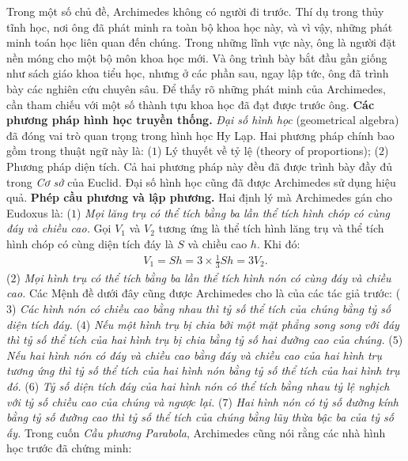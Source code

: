 \begin{multicols}{2}
	\vskip 0.1cm
	Trong một số chủ đề, Archimedes không có người đi trước. Thí dụ trong thủy tĩnh học, nơi ông đã phát minh ra toàn bộ khoa học này, và vì vậy, những phát minh toán học liên quan đến chúng. Trong những lĩnh vực này, ông là người đặt nền móng cho một bộ môn khoa học mới. Và ông trình bày bắt đầu gần giống như sách giáo khoa tiểu học, nhưng ở các phần sau, ngay lập tức, ông đã trình bày các nghiên cứu chuyên sâu. 
	\vskip 0.1cm
	Để thấy rõ những phát minh của Archimedes, cần tham chiếu với một số thành tựu khoa học đã đạt được trước ông.
	\vskip 0.1cm
	\textbf{\color{lichsutoanhoc}Các phương pháp hình học truyền thống.} \textit{Đại số hình học} (geometrical algebra) đã đóng vai trò quan trọng trong hình học Hy Lạp. Hai phương pháp chính bao gồm trong thuật ngữ này là: ($1$) Lý thuyết về tỷ lệ (theory of proportions); ($2$) Phương pháp diện tích. Cả hai phương pháp này đều đã được trình bày đầy đủ trong \textit{Cơ sở} của Euclid. Đại số hình học cũng đã được Archimedes sử dụng hiệu quả. 
	\vskip 0.1cm
	\textbf{\color{lichsutoanhoc}Phép cầu phương và lập phương.} Hai định lý mà Archimedes gán cho Eudoxus là:
	\vskip 0.1cm
	($1$) \textit{Mọi lăng trụ có thể tích bằng ba lần thể tích hình chóp có cùng đáy và chiều cao.} 
	\vskip 0.1cm
	Gọi  $V_1$ và $V_2$ tương ứng là thể tích hình lăng trụ và thể tích hình chóp có cùng diện tích đáy là $S$  và chiều cao $h$. Khi đó:
	\begin{align*}
		V_1 = Sh = 3\times\frac{1}{3}Sh = 3V_2.
	\end{align*}
	($2$) \textit{Mọi hình trụ có thể tích bằng ba lần thể tích hình nón có cùng đáy và chiều cao.}
	\vskip 0.1cm
	Các Mệnh đề dưới đây cũng được Archimedes cho là của các tác giả trước:  
	\vskip 0.1cm
	($3$) \textit{Các hình nón có chiều cao bằng nhau thì tỷ số thể tích của chúng bằng tỷ số diện tích đáy.}
	\vskip 0.1cm
	($4$) \textit{Nếu một hình trụ bị chia bởi một mặt phẳng song song với đáy thì tỷ số thể tích của hai hình trụ bị chia bằng tỷ số hai đường cao của chúng.}
	\vskip 0.1cm
	($5$) \textit{Nếu hai hình nón có đáy và chiều cao bằng đáy và chiều cao của hai hình trụ tương ứng thì tỷ số thể tích của hai hình nón bằng tỷ số thể tích của hai hình trụ đó.}
	\vskip 0.1cm
	($6$) \textit{Tỷ số diện tích đáy của hai hình nón có thể tích bằng nhau tỷ lệ nghịch với tỷ số chiều cao của chúng và ngược lại. }
	\vskip 0.1cm
	($7$) \textit{Hai hình nón có tỷ số đường kính bằng tỷ số đường cao thì tỷ số thể tích của chúng bằng lũy thừa bậc ba của tỷ số ấy.} 
	\vskip 0.1cm
	Trong cuốn \textit{Cầu phương Parabola}, Archimedes cũng nói rằng các nhà hình học trước đã chứng minh:

\end{multicols}
